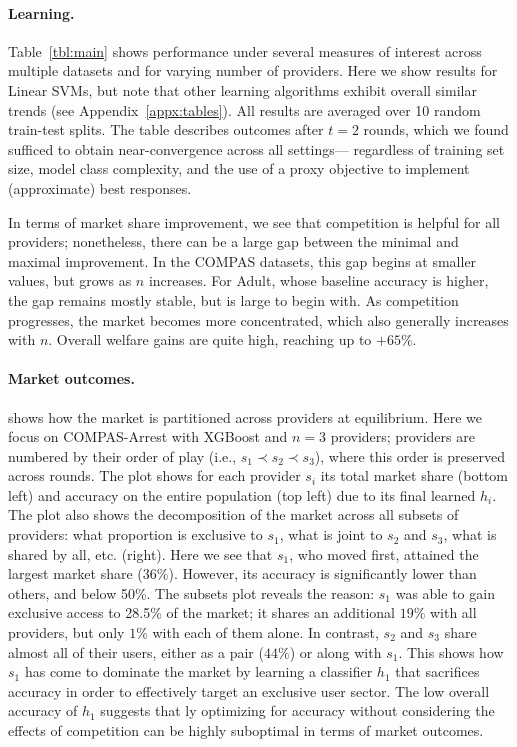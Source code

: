 \paragraph{Learning.}
Table~\ref{tbl:main} shows performance under several measures of interest across multiple datasets and for varying number of providers.
Here we show results for Linear SVMs, but note that other learning algorithms exhibit overall similar trends (see Appendix~\ref{appx:tables}).
All results are averaged over 10 random train-test splits.
The table describes outcomes after $t=2$ rounds,
which we found sufficed to obtain near-convergence across all settings---%
regardless of training set size, model class complexity, and the use of a proxy objective to implement (approximate) best responses.


In terms of market share improvement, we see that competition is helpful for all providers; nonetheless, there can be a large gap between the minimal and maximal improvement.
In the COMPAS datasets, this gap begins at smaller values,
but grows as $n$ increases.
For Adult, whose baseline accuracy is higher,
the gap remains mostly stable, but is large to begin with.
As competition progresses, the market becomes more concentrated,
which also generally increases with $n$.
Overall welfare gains are quite high, reaching up to $+65\%$.



\paragraph{Market outcomes.}
 shows how the market is partitioned across providers at equilibrium.
Here we focus on COMPAS-Arrest with XGBoost and $n=3$ providers;
providers are numbered by their order of play (i.e., $s_1 \prec s_2 \prec s_3$),
where this order is preserved across rounds.
The plot shows for each provider $s_i$ its total market share
(bottom left) and accuracy on the entire population (top left)
due to its final learned $h_i$.
The plot also shows the decomposition of the market 
across all subsets of providers: what proportion is exclusive to $s_1$, what is joint to $s_2$ and $s_3$, what is shared by all, etc. (right).
Here we see that $s_1$, who moved first, attained the largest market share (36\%).
However, its accuracy is significantly lower than others, and below 50\%.
The subsets plot reveals the reason:
$s_1$ was able to gain exclusive access to 28.5\% of the market;
it shares an additional $19\%$ with all providers,
but only $1\%$ with each of them alone.
In contrast, $s_2$ and $s_3$ share almost all of their users,
either as a pair ($44\%$) or along with $s_1$.
This shows how $s_1$ has come to dominate the market by learning a classifier $h_1$ that 
sacrifices accuracy in order to effectively target an exclusive user sector.
The low overall accuracy of $h_1$ suggests that {\naive}ly optimizing for accuracy without considering the effects of competition can be highly suboptimal in terms of market outcomes.
\squeeze


